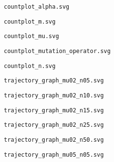 \documentclass{article}
\begin{document}
\verb|countplot_alpha.svg|
\begin{figure}[t]
\centering

\vskip-8pt
\end{figure}
\newpage
\verb|countplot_m.svg|
\begin{figure}[t]
\centering

\vskip-8pt
\end{figure}
\newpage
\verb|countplot_mu.svg|
\begin{figure}[t]
\centering

\vskip-8pt
\end{figure}
\newpage
\verb|countplot_mutation_operator.svg|
\begin{figure}[t]
\centering

\vskip-8pt
\end{figure}
\newpage
\verb|countplot_n.svg|
\begin{figure}[t]
\centering

\vskip-8pt
\end{figure}
\newpage
\verb|trajectory_graph_mu02_n05.svg|
\begin{figure}[t]
\centering

\vskip-8pt
\end{figure}
\newpage
\verb|trajectory_graph_mu02_n10.svg|
\begin{figure}[t]
\centering

\vskip-8pt
\end{figure}
\newpage
\verb|trajectory_graph_mu02_n15.svg|
\begin{figure}[t]
\centering

\vskip-8pt
\end{figure}
\newpage
\verb|trajectory_graph_mu02_n25.svg|
\begin{figure}[t]
\centering

\vskip-8pt
\end{figure}
\newpage
\verb|trajectory_graph_mu02_n50.svg|
\begin{figure}[t]
\centering

\vskip-8pt
\end{figure}
\newpage
\verb|trajectory_graph_mu05_n05.svg|
\begin{figure}[t]
\centering

\vskip-8pt
\end{figure}
\end{document}
